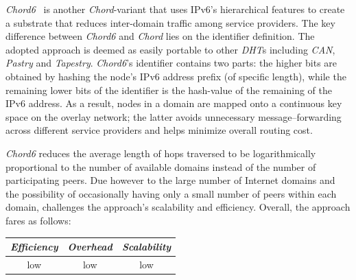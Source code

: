 \emph{Chord6}~\cite{XZHL2005} is another \emph{Chord}-variant that
uses IPv6's  hierarchical features to create 
a substrate that reduces inter-domain traffic among service providers. 
The key difference between
\emph{Chord6} and \emph{Chord} lies on the identifier definition. 
The adopted approach is deemed as easily portable to other 
\emph{DHT}s including \emph{CAN}, \emph{Pastry} and \emph{Tapestry}. 
\emph{Chord6}'s identifier contains two parts: 
the higher bits are obtained by hashing the
node's IPv6 address prefix (of specific length), 
while the remaining lower bits of the identifier 
is the hash-value of the remaining of the IPv6 address. 
As a result, nodes in a domain are mapped 
onto a continuous key space on the overlay network;
the latter avoids unnecessary message--forwarding across different
service providers and helps minimize overall routing cost.

\emph{Chord6} reduces the average 
length of hops traversed
to be logarithmically proportional to the number 
of available domains instead of the number of participating peers. 
Due however to the large number of Internet
domains and the possibility of occasionally having only 
a small number of peers within each domain,
\cite{DK2006} challenges the approach's scalability and efficiency.
Overall, the approach fares as follows:
\begin{center}
{\footnotesize
\begin{tabular}{ccc}
\emph{Efficiency} & \emph{Overhead} & \emph{Scalability} \\
\hline
low &
low &
low
\end{tabular}
}
\end{center}

